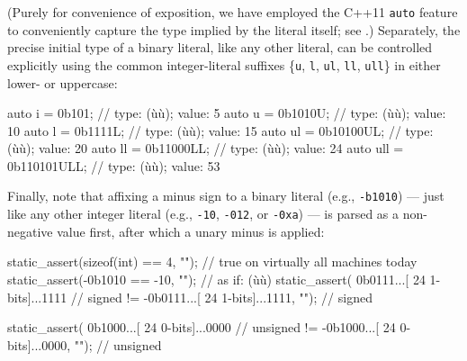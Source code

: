 \noindent (Purely for convenience of
exposition, we have employed the C++11 \lstinline!auto! feature to
conveniently capture the type implied by the literal itself; see .) Separately, the precise initial type of a binary literal, like any other
literal, can be controlled explicitly using the common integer-literal
suffixes \{\lstinline!u!, \lstinline!l!, \lstinline!ul!, \lstinline!ll!,
\lstinline!ull!\} in either lower- or uppercase:

\begin{emcppslisting}
auto i   = 0b101;        // type: (ù{}ù);                 value: 5
auto u   = 0b1010U;      // type: (ù{}ù);        value: 10
auto l   = 0b1111L;      // type: (ù{}ù);                value: 15
auto ul  = 0b10100UL;    // type: (ù{}ù);       value: 20
auto ll  = 0b11000LL;    // type: (ù{}ù);           value: 24
auto ull = 0b110101ULL;  // type: (ù{}ù);  value: 53
\end{emcppslisting}


\noindent Finally, note that affixing a minus sign to a binary
literal (e.g., \lstinline!-b1010!) --- just like any other integer literal
(e.g., \lstinline!-10!, \lstinline!-012!, or \lstinline!-0xa!) --- is parsed as a
non-negative value first, after which a unary minus is applied:

\begin{emcppslisting}[emcppsignore={Invalid Descriptive Literals}]
static_assert(sizeof(int) == 4, "");  // true on virtually all machines today
static_assert(-0b1010 == -10, "");    // as if: (ù{}ù)
static_assert( 0b0111...[ 24 1-bits]...1111       //   signed
           != -0b0111...[ 24 1-bits]...1111, ""); //   signed

static_assert( 0b1000...[ 24 0-bits]...0000       // unsigned
           != -0b1000...[ 24 0-bits]...0000, ""); // unsigned
\end{emcppslisting}



